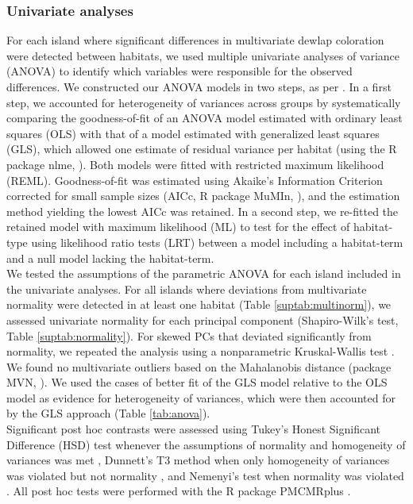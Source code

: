 \subsubsection*{Univariate analyses}

For each island where significant differences in multivariate dewlap coloration were detected between habitats, we used multiple univariate analyses of variance (ANOVA) to identify which variables were responsible for the observed differences. We constructed our ANOVA models in two steps, as per \citet{Zuur2009}. In a first step, we accounted for heterogeneity of variances across groups by systematically comparing the goodness-of-fit of an ANOVA model estimated with ordinary least squares (OLS) with that of a model estimated with generalized least squares (GLS), which allowed one estimate of residual variance per habitat (using the R package nlme, \citealt{Pinheiro2000, Pinheiro2020}). Both models were fitted with restricted maximum likelihood (REML). Goodness-of-fit was estimated using Akaike's Information Criterion corrected for small sample sizes (AICc, R package MuMIn, \citealt{Barton2019}), and the estimation method yielding the lowest AICc was retained. In a second step, we re-fitted the retained model with maximum likelihood (ML) to test for the effect of habitat-type using likelihood ratio tests (LRT) between a model including a habitat-term and a null model lacking the habitat-term.\\

We tested the assumptions of the parametric ANOVA for each island included in the univariate analyses. For all islands where deviations from multivariate normality were detected in at least one habitat (Table \ref{suptab:multinorm}), we assessed univariate normality for each principal component (Shapiro-Wilk's test, Table \ref{suptab:normality}). For skewed PCs that deviated significantly from normality, we repeated the analysis using a nonparametric Kruskal-Wallis test \citep{Hollander2013}. We found no multivariate outliers based on the Mahalanobis distance (package MVN, \citealt{Korkmaz2014}). We used the cases of better fit of the GLS model relative to the OLS model as evidence for heterogeneity of variances, which were then accounted for by the GLS approach (Table \ref{tab:anova}).\\

Significant post hoc contrasts were assessed using Tukey's Honest Significant Difference (HSD) test whenever the assumptions of normality and homogeneity of variances was met \citep{Tukey1949}, Dunnett's T3 method when only homogeneity of variances was violated but not normality \citep{Dunnett1980}, and Nemenyi's test when normality was violated \citep{Nemenyi1963}. All post hoc tests were performed with the R package PMCMRplus \citep{Pohlert2020}.\\

